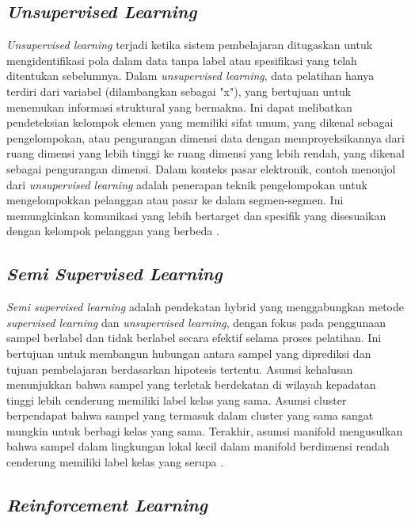 \subsection{\emph{Unsupervised Learning}}
\label{subsec:unsupervisedlearning}

\emph{Unsupervised learning} terjadi ketika sistem pembelajaran ditugaskan untuk mengidentifikasi pola dalam data tanpa label atau spesifikasi yang telah ditentukan sebelumnya. Dalam \emph{unsupervised learning}, data pelatihan hanya terdiri dari variabel (dilambangkan sebagai "x"), yang bertujuan untuk menemukan informasi struktural yang bermakna. Ini dapat melibatkan pendeteksian kelompok elemen yang memiliki sifat umum, yang dikenal sebagai pengelompokan, atau pengurangan dimensi data dengan memproyeksikannya dari ruang dimensi yang lebih tinggi ke ruang dimensi yang lebih rendah, yang dikenal sebagai pengurangan dimensi. Dalam konteks pasar elektronik, contoh menonjol dari \emph{unsupervised learning} adalah penerapan teknik pengelompokan untuk mengelompokkan pelanggan atau pasar ke dalam segmen-segmen. Ini memungkinkan komunikasi yang lebih bertarget dan spesifik yang disesuaikan dengan kelompok pelanggan yang berbeda \parencite{Janiesch}.

\subsection{\emph{Semi Supervised Learning}}
\label{subsec:semiisupervisedlearning}

\emph{Semi supervised learning} adalah pendekatan hybrid yang menggabungkan metode \emph{supervised learning} dan \emph{unsupervised learning}, dengan fokus pada penggunaan sampel berlabel dan tidak berlabel secara efektif selama proses pelatihan. Ini bertujuan untuk membangun hubungan antara sampel yang diprediksi dan tujuan pembelajaran berdasarkan hipotesis tertentu. Asumsi kehalusan menunjukkan bahwa sampel yang terletak berdekatan di wilayah kepadatan tinggi lebih cenderung memiliki label kelas yang sama. Asumsi cluster berpendapat bahwa sampel yang termasuk dalam cluster yang sama sangat mungkin untuk berbagi kelas yang sama. Terakhir, asumsi manifold mengusulkan bahwa sampel dalam lingkungan lokal kecil dalam manifold berdimensi rendah cenderung memiliki label kelas yang serupa \parencite{Wang}.

\subsection{\emph{Reinforcement Learning}}
\label{subsec:reinforcementlearning}

